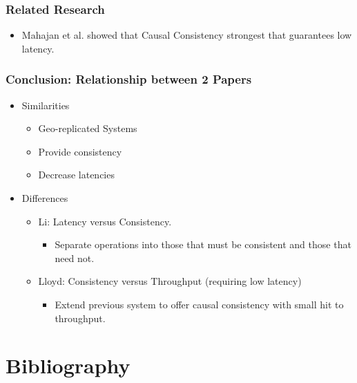 \documentclass{beamer}
\begin{document}
\begin{frame}
\frametitle{Related Research}
\begin{itemize}
\pause \item Mahajan et al. showed that Causal Consistency strongest that guarantees low latency.
\end{itemize}  
\end{frame}

\begin{frame}
\frametitle{Conclusion: Relationship between 2 Papers}
\begin{itemize}
\pause \item Similarities
	\begin{itemize}
		\item Geo-replicated Systems
		\item Provide consistency
		\item Decrease latencies
	\end{itemize}
\pause \item Differences
	\begin{itemize}
		\item Li: Latency versus Consistency.
			\begin{itemize}
				\item Separate operations into those that must be consistent and those that need not.
			\end{itemize}
		\item Lloyd: Consistency versus Throughput (requiring low latency)
			\begin{itemize}
				\item Extend previous system to offer causal consistency with small hit to throughput.
			\end{itemize}
	\end{itemize}

\end{itemize}  
\end{frame}



\section{Bibliography} 
\end{document}
